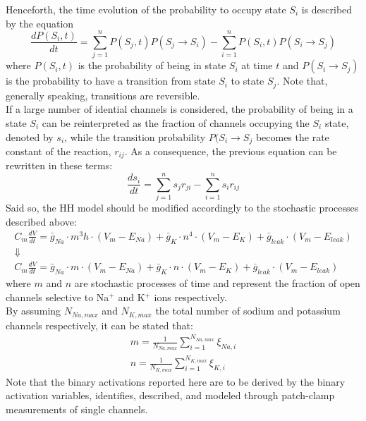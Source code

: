 Henceforth, the time evolution of the probability to occupy state \(S_{i}\) is described by the
equation
\begin{equation*}
    \frac{dP(S_{i},t)}{dt}
    =\sum_{j=1}^{n}P(S_{j},t)P(S_{j}\rightarrow{S_{i}})-\sum_{i=1}^{n}P(S_{i},t)P(S_{i}\rightarrow{S_{j}})
\end{equation*}
where \(P(S_{i},t)\) is the probability of being in state \(S_{i}\) at time \(t\) and
\(P(S_{i}\rightarrow{S_{j}})\) is the probability to have a transition from state \(S_{i}\)
to state \(S_{j}\). Note that, generally speaking, transitions are reversible.\\
If a large number of idential channels is considered, the probability of being in a state \(S_{i}\) can
be reinterpreted as the fraction of channels occupying the \(S_{i}\) state, denoted by \(s_{i}\), while
the transition probability \(P(S_{i}\rightarrow{S_{j}}\) becomes the rate constant of the reaction, \(r_{ij}\).
As a consequence, the previous equation can be rewritten in these terms:
\begin{equation*}
    \frac{ds_{i}}{dt}=\sum_{j=1}^{n}s_{j}r_{ji}-\sum_{i=1}^{n}s_{i}r_{ij}
\end{equation*}
Said so, the HH model should be modified accordingly to the stochastic processes described above:
\begin{gather*}
    C_{m}\frac{dV}{dt}
    =\bar{g}_{Na}\cdot{m^{3}h}\cdot{(V_{m}-E_{Na})}
    +\bar{g}_{K}\cdot{n^{4}}\cdot{(V_{m}-E_{K})}
    +\bar{g}_{leak}\cdot{(V_{m}-E_{leak})}\\
    \Downarrow\\
    C_{m}\frac{dV}{dt}
    =\bar{g}_{Na}\cdot{m}\cdot{(V_{m}-E_{Na})}
    +\bar{g}_{K}\cdot{n}\cdot{(V_{m}-E_{K})}
    +\bar{g}_{leak}\cdot{(V_{m}-E_{leak})}
\end{gather*}
where \(m\) and \(n\) are stochastic processes of time and represent the fraction of open channels
selective to Na\({}^{+}\) and K\({}^{+}\) ions respectively.\\
By assuming \(N_{Na,max}\) and \(N_{K,max}\) the total number of sodium and potassium channels
respectively, it can be stated that:
\begin{gather*}
    m=\frac{1}{N_{Na,max}}\sum_{i=1}^{N_{Na,max}}\xi_{Na,i}\\
    n=\frac{1}{N_{K,max}}\sum_{i=1}^{N_{K,max}}\xi_{K,i}
\end{gather*}
Note that the binary activations reported here are to be derived by the binary activation variables,
identifies, described, and modeled through patch-clamp measurements of single channels.\\
